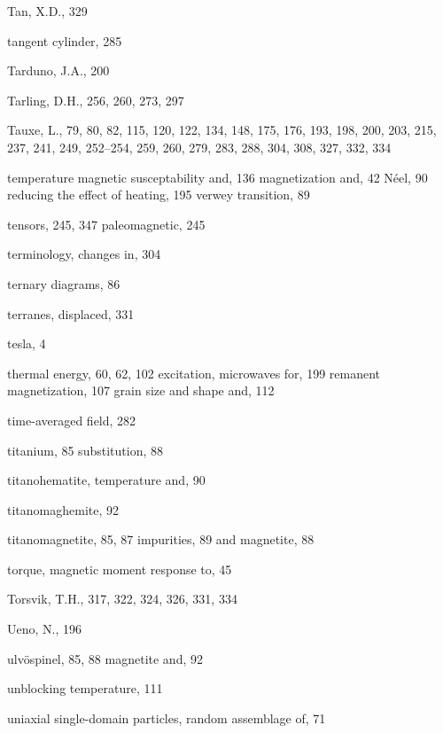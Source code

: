\documentclass[,plain]{tauxe}
\begin{document}
\begin{theindex}
  \indexspace

  \item Tan, X.D., 329
  \item tangent cylinder, 285
  \item Tarduno, J.A., 200
  \item Tarling, D.H., 256, 260, 273, 297
  \item Tauxe, L., 79, 80, 82, 115, 120, 122, 134, 148, 175, 176, 193, 
		198, 200, 203, 215, 237, 241, 249, 252--254, 259, 260, 
		279, 283, 288, 304, 308, 327, 332, 334
  \item temperature
    \subitem magnetic susceptability and, 136
    \subitem magnetization and, 42
    \subitem N\'eel, 90
    \subitem reducing the effect of heating, 195
    \subitem verwey transition, 89
  \item tensors, 245, 347
    \subitem paleomagnetic, 245
  \item terminology, changes in, 304
  \item ternary diagrams, 86
  \item terranes, displaced, 331
  \item tesla, 4
  \item thermal 
	\subitem energy, 60, 62, 102
  \subitem excitation, microwaves for, 199
  \subitem remanent magnetization, 107
    \subsubitem grain size and shape and, 112
  \item time-averaged field, 282
  \item titanium, 85
  \subitem substitution, 88
  \item titanohematite, temperature and, 90
  \item titanomaghemite, 92
  \item titanomagnetite, 85, 87
    \subitem impurities, 89
	\subitem and magnetite, 88
    \item torque, magnetic moment response to, 45
  \item Torsvik, T.H., 317, 322, 324, 326, 331, 334

  \indexspace

  \item Ueno, N., 196
  \item ulv\"ospinel, 85, 88
    \subitem magnetite and, 92
  \item unblocking temperature, 111
  \item uniaxial single-domain particles, random assemblage of, 71


\end{theindex}
\end{document}
